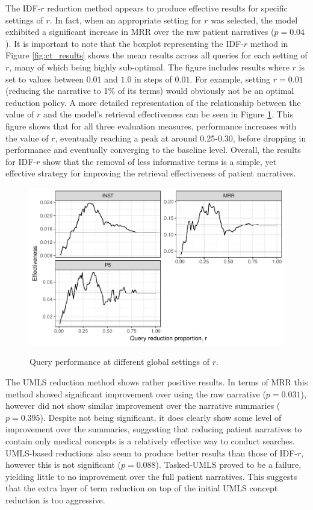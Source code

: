 \documentclass[a4paper]{report}
\begin{document}
The IDF-$r$ reduction method appears to produce effective results for specific settings of $r$. In fact, when an appropriate setting for $r$ was selected, the model exhibited a significant increase in MRR over the raw patient narratives ($p=0.04$). It is important to note that the boxplot representing the IDF-$r$ method in Figure \ref{fig:ct_results} shows the mean results across all queries for each setting of $r$, many of which being highly sub-optimal. The figure includes results where $r$ is set to values between $0.01$ and $1.0$ in steps of $0.01$. For example, setting $r = 0.01$ (reducing the narrative to 1\% of its terms) would obviously not be an optimal reduction policy. A more detailed representation of the relationship between the value of $r$ and the model's retrieval effectiveness can be seen in Figure \ref{ct-idf-r}. This figure shows that for all three evaluation measures, performance increases with the value of $r$, eventually reaching a peak at around 0.25-0.30, before dropping in performance and eventually converging to the baseline level. Overall, the results for IDF-$r$ show that the removal of less informative terms is a simple, yet effective strategy for improving the retrieval effectiveness of patient narratives.

\begin{figure}
\centering
\caption{Query performance at different global settings of $r$.}
\includegraphics[width=.9\columnwidth]{ct-idf-r.pdf}
\label{ct-idf-r}
\end{figure}

The UMLS reduction method shows rather positive results. In terms of MRR this method showed significant improvement over using the raw narrative ($p = 0.031$), however did not show similar improvement over the narrative summaries ($p = 0.395$). Despite not being significant, it does clearly show some level of improvement over the summaries, suggesting that reducing patient narratives to contain only medical concepts is a relatively effective way to conduct searches. UMLS-based reductions also seem to produce better results than those of IDF-$r$, however this is not significant ($p = 0.088$). Tasked-UMLS proved to be a failure, yielding little to no improvement over the full patient narratives. This suggests that the extra layer of term reduction on top of the initial UMLS concept reduction is too aggressive.
\end{document}
